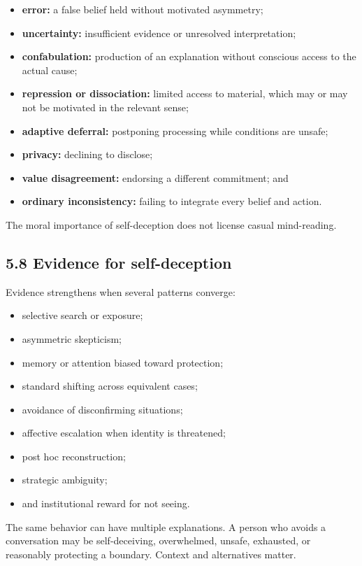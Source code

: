 \documentclass[
  11pt,
]{article}
\providecommand{\tightlist}{%
  \setlength{\itemsep}{0pt}\setlength{\parskip}{0pt}}
\begin{document}
\begin{itemize}
\tightlist
\item
  \textbf{error:} a false belief held without motivated asymmetry;
\item
  \textbf{uncertainty:} insufficient evidence or unresolved
  interpretation;
\item
  \textbf{confabulation:} production of an explanation without conscious
  access to the actual cause;
\item
  \textbf{repression or dissociation:} limited access to material, which
  may or may not be motivated in the relevant sense;
\item
  \textbf{adaptive deferral:} postponing processing while conditions are
  unsafe;
\item
  \textbf{privacy:} declining to disclose;
\item
  \textbf{value disagreement:} endorsing a different commitment; and
\item
  \textbf{ordinary inconsistency:} failing to integrate every belief and
  action.
\end{itemize}

The moral importance of self-deception does not license casual
mind-reading.

\subsection{5.8 Evidence for
self-deception}\label{evidence-for-self-deception}

Evidence strengthens when several patterns converge:

\begin{itemize}
\tightlist
\item
  selective search or exposure;
\item
  asymmetric skepticism;
\item
  memory or attention biased toward protection;
\item
  standard shifting across equivalent cases;
\item
  avoidance of disconfirming situations;
\item
  affective escalation when identity is threatened;
\item
  post hoc reconstruction;
\item
  strategic ambiguity;
\item
  and institutional reward for not seeing.
\end{itemize}

The same behavior can have multiple explanations. A person who avoids a
conversation may be self-deceiving, overwhelmed, unsafe, exhausted, or
reasonably protecting a boundary. Context and alternatives matter.
\end{document}
